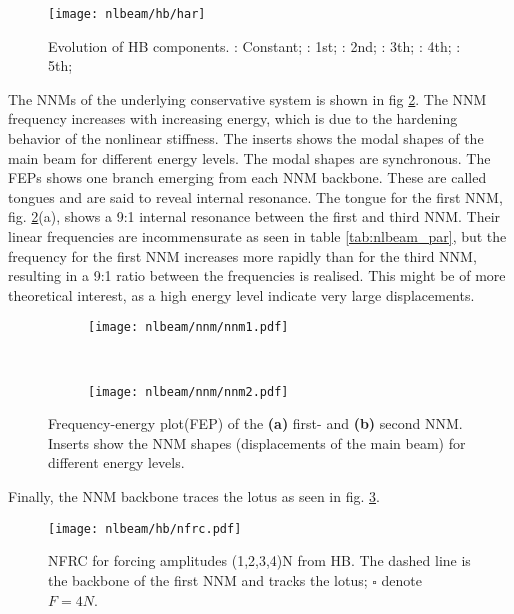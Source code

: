 \begin{figure}[!ht]
  \centering
  \texttt{[image: nlbeam/hb/har]}
  \caption{Evolution of HB components.
    \textcolor{blue}{\sampleline{}}: Constant;
    \sampleline{}: 1st;
    \textcolor{orange}{}: 2nd;
    \textcolor{green}{}: 3th;
    \textcolor{red}{\sampleline{}}: 4th;
    \textcolor{purple}{}: 5th;
  }
  \label{fig:nlbeam_hb_components}
\end{figure}

The NNMs of the underlying conservative system is shown in fig
\ref{fig:nlbeam_nnm}. The NNM frequency increases with increasing energy, which
is due to the hardening behavior of the nonlinear stiffness. The inserts shows
the modal shapes of the main beam for different energy levels. The modal shapes
are synchronous.
The FEPs shows one branch emerging from each NNM backbone. These are called
tongues and are said to reveal internal resonance. The tongue for the first NNM,
fig. \ref{fig:nlbeam_nnm}(a), shows a 9:1 internal resonance between the first
and third NNM. Their linear frequencies are incommensurate as seen in table
\ref{tab:nlbeam_par}, but the frequency for the first NNM increases more rapidly
than for the third NNM, resulting in a 9:1 ratio between the frequencies is
realised. This might be of more theoretical interest, as a high energy level
indicate very large displacements.

\begin{figure}[!ht]
  \centering
 \begin{subfigure}[b]{0.45\textwidth}
    \texttt{[image: nlbeam/nnm/nnm1.pdf]}
    \caption{}
  \end{subfigure}
  ~
  \begin{subfigure}[b]{0.45\textwidth}
    \texttt{[image: nlbeam/nnm/nnm2.pdf]}
    \caption{}
  \end{subfigure}
  \caption{Frequency-energy plot(FEP) of the
    \textbf{(a)} first- and
    \textbf{(b)} second NNM. Inserts show the NNM shapes (displacements of the
    main beam) for different energy levels.}
  \label{fig:nlbeam_nnm}
\end{figure}

Finally, the NNM backbone traces the lotus as seen in fig.
\ref{fig:nlbeam_sweep}.

\begin{figure}[!ht]
  \centering
  \texttt{[image: nlbeam/hb/nfrc.pdf]}
  \caption{
    NFRC for forcing amplitudes (1,2,3,4)N from HB. The dashed line is
    the backbone of the first NNM and tracks the lotus;
    $\square$ denote $F=4N$.
    }
  \label{fig:nlbeam_sweep}
\end{figure}


